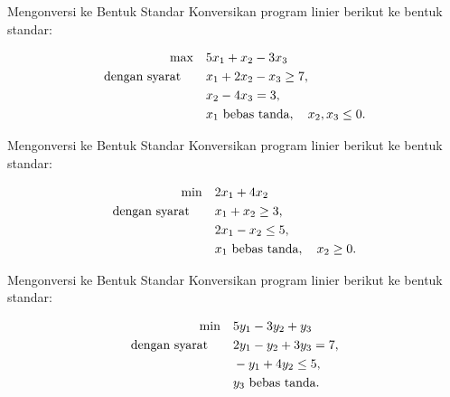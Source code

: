 \begin{ex}{Mengonversi ke Bentuk Standar}{}
\label{ex:standard-form-3}
 Konversikan program linier berikut ke bentuk standar:

\[
\begin{aligned}
    \max \quad & 5x_1 + x_2 - 3x_3 \\
    \mbox{dengan syarat}\quad \quad
    & x_1 + 2x_2 - x_3 \geq 7, \\
    & x_2 - 4x_3 = 3, \\
    & x_1 \mbox{ bebas tanda}, \quad x_2, x_3 \leq 0.
\end{aligned}
\]
\end{ex}

\begin{ex}{Mengonversi ke Bentuk Standar}{}
\label{ex:84}
 Konversikan program linier berikut ke bentuk standar:

\[
\begin{aligned}
    \min \quad & 2x_1 + 4x_2 \\
    \mbox{dengan syarat}\quad \quad
    & x_1 + x_2 \geq 3, \\
    & 2x_1 - x_2 \leq 5, \\
    & x_1 \mbox{ bebas tanda}, \quad x_2 \geq 0.
\end{aligned}
\]
\end{ex}

\begin{ex}{Mengonversi ke Bentuk Standar}{}
\label{ex:85}
 Konversikan program linier berikut ke bentuk standar:

\[
\begin{aligned}
    \min \quad & 5y_1 - 3y_2 + y_3 \\
    \mbox{dengan syarat}\quad \quad
    & 2y_1 - y_2 + 3y_3 = 7, \\
    & -y_1 + 4y_2 \leq 5, \\
    & y_3 \mbox{ bebas tanda}.
\end{aligned}
\]
\end{ex}


